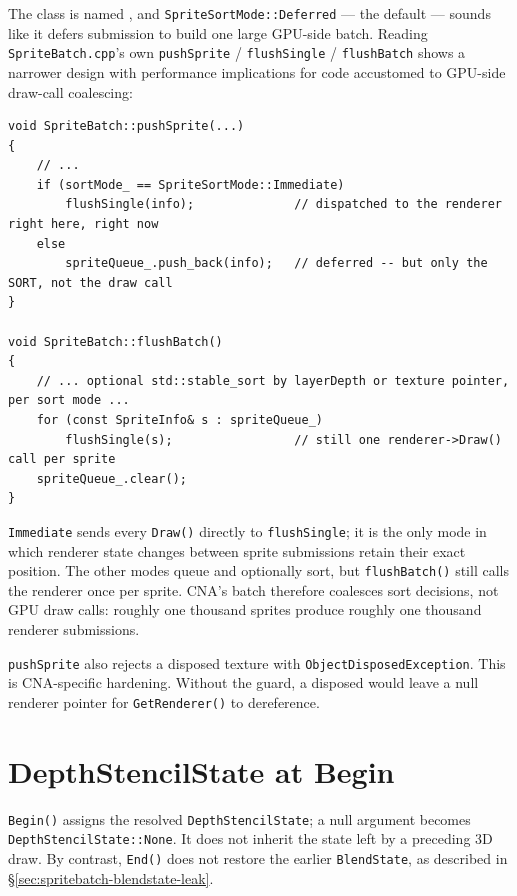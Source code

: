 The class is named , and \texttt{SpriteSortMode::Deferred} --- the
default --- sounds like it defers submission to build one large GPU-side batch. Reading
\texttt{SpriteBatch.cpp}'s own \texttt{pushSprite} / \texttt{flushSingle} / \texttt{flushBatch}
shows a narrower design with performance implications for code accustomed to GPU-side
draw-call coalescing:

\begin{lstlisting}
void SpriteBatch::pushSprite(...)
{
    // ...
    if (sortMode_ == SpriteSortMode::Immediate)
        flushSingle(info);              // dispatched to the renderer right here, right now
    else
        spriteQueue_.push_back(info);   // deferred -- but only the SORT, not the draw call
}

void SpriteBatch::flushBatch()
{
    // ... optional std::stable_sort by layerDepth or texture pointer, per sort mode ...
    for (const SpriteInfo& s : spriteQueue_)
        flushSingle(s);                 // still one renderer->Draw() call per sprite
    spriteQueue_.clear();
}
\end{lstlisting}

\texttt{Immediate} sends every \texttt{Draw()} directly to \texttt{flushSingle}; it is the only
mode in which renderer state changes between sprite submissions retain their exact position.
The other modes queue and optionally sort, but \texttt{flushBatch()} still calls the renderer
once per sprite. CNA's batch therefore coalesces sort decisions, not GPU draw calls: roughly one
thousand sprites produce roughly one thousand renderer submissions.

\texttt{pushSprite} also rejects a disposed texture with
\texttt{ObjectDisposedException}. This is CNA-specific hardening. Without the guard, a disposed
 would leave a null renderer pointer for \texttt{GetRenderer()} to
dereference.

\section{DepthStencilState at Begin}

\begin{contractnote}
\texttt{Begin()} assigns the resolved \texttt{DepthStencilState}; a null argument becomes
\texttt{DepthStencilState::None}. It does not inherit the state left by a preceding 3D draw.
By contrast, \texttt{End()} does not restore the earlier \texttt{BlendState}, as described in
\S\ref{sec:spritebatch-blendstate-leak}.
\end{contractnote}

